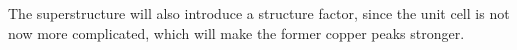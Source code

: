 \documentclass[a4paper,10pt]{scrartcl}
\begin{document}
The superstructure will also introduce a structure factor, since the unit cell is not now more complicated, which will make the former copper peaks stronger. 

\begin{figure}
\centering
{}
\subfigure[ ]{
}
\end{figure}
\end{document}
